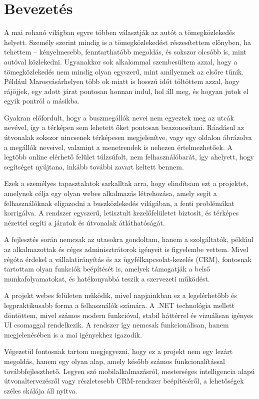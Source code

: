 \section{Bevezetés}

\indent A mai rohanó világban egyre többen választják az autót a tömegközlekedés helyett. Személy szerint mindig is a tömegközlekedést részesítettem előnyben, ha tehettem – kényelmesebb, fenntarthatóbb megoldás, és sokszor olcsóbb is, mint autóval közlekedni. Ugyanakkor sok alkalommal szembesültem azzal, hogy a tömegközlekedés nem mindig olyan egyszerű, mint amilyennek az elsőre tűnik. Például Marosvásárhelyen több ok miatt is hosszú időt töltöttem azzal, hogy rájöjjek, egy adott járat pontosan honnan indul, hol áll meg, és hogyan jutok el egyik pontról a másikba.

Gyakran előfordult, hogy a buszmegállók nevei nem egyeztek meg az utcák nevével, így a térképen sem lehetett őket pontosan beazonosítani. Ráadásul az útvonalak sokszor nincsenek térképesen megjelenítve, vagy egy oldalon ábrázolva a megállók neveivel, valamint a menetrendek is nehezen értelmezhetőek. A legtöbb online elérhető felület túlzsúfolt, nem felhasználóbarát, így ahelyett, hogy segítséget nyújtana, inkább további zavart keltett bennem.

Ezek a személyes tapasztalatok sarkalltak arra, hogy elindítsam ezt a projektet, amelynek célja egy olyan webes alkalmazás létrehozása, amely segít a felhasználóknak eligazodni a buszközlekedés világában, a fenti problémákat korrigálva. A rendszer egyszerű, letisztult kezelőfelületet biztosít, és térképes nézettel segíti a járatok és útvonalak átláthatóságát.

A fejlesztés során nemcsak az utasokra gondoltam, hanem a szolgáltatók, például az alkalmazottak és céges adminisztrátorok igényeit is figyelembe vettem. Mivel régóta érdekel a vállalatirányítás és az ügyfélkapcsolat-kezelés (CRM), fontosnak tartottam olyan funkciók beépítését is, amelyek támogatják a belső munkafolyamatokat, és hatékonyabbá teszik a szervezeti működést.

A projekt webes felületen működik, mivel napjainkban ez a legelérhetőbb és legpraktikusabb forma a felhasználók számára. A .NET technológia mellett döntöttem, mivel számos modern funkcióval, stabil háttérrel és vizuálisan igényes UI csomaggal rendelkezik. A rendszer így nemcsak funkcionálisan, hanem megjelenésében is a mai igényekhez igazodik.

Végezetül fontosnak tartom megjegyezni, hogy ez a projekt nem egy lezárt megoldás, hanem egy olyan alap, amely később számos funkcionalítással továbbfejleszthető. Legyen szó mobilalkalmazásról, mesterséges intelligencia alapú útvonaltervezésről vagy részletesebb CRM-rendszer beépítéséről, a lehetőségek széles skálája áll nyitva.

